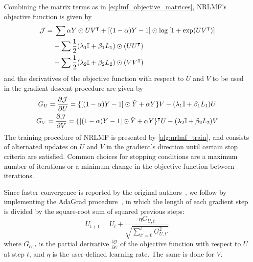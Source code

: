 Combining the matrix terms as in \autoref{eq:lmf_objective_matrices}, NRLMF's objective function is given by
%
\begin{equation}
    \begin{split}
        \mathcal{J} = &\; \sum
                \alpha Y \odot UV^\intercal
                + [(1 - \alpha) Y - 1] \odot \log \left[1+\exp(UV^\intercal)\right]\\
            &- \sum \frac{1}{2} (\lambda_1\mathbb{I} + \beta_1 L_1) \odot (U U^\intercal)\\
            &- \sum \frac{1}{2} (\lambda_2\mathbb{I} + \beta_2 L_2) \odot (V V^\intercal)
    \end{split}
    \label{eq:nrlmf_objective}
\end{equation}
%
and the derivatives of the objective function with respect to $U$ and $V$ to be used in the gradient descent procedure are given by
\begin{gather}
    G_U = \frac{\partial \mathcal{J}}{\partial U} =
        \{[(1 - \alpha) Y - 1] \odot \hat Y + \alpha Y\}V
        - (\lambda_1\mathbb{I} + \beta_1 L_1) U
    \label{eq:nrlmf_gradient_U}
    \\
    G_V = \frac{\partial \mathcal{J}}{\partial V} =
        \{[(1 - \alpha) Y - 1] \odot \hat Y + \alpha Y\}^\intercal U
        - (\lambda_2\mathbb{I} + \beta_2 L_2) V
    \label{eq:nrlmf_gradient_V}
\end{gather}
%
The training procedure of NRLMF is presented by \autoref{alg:nrlmf_train}, and consists of alternated updates on $U$ and $V$ in the gradient's direction until certain stop criteria are satisfied. Common choices for stopping conditions are a maximum number of iterations or a minimum change in the objective function between iterations.

Since faster convergence is reported by the original authors~\cite{johnsonlogistic}, we follow \textcite{johnsonlogistic,liu2016neighborhooda} by implementing the AdaGrad procedure~\cite{duchi2011adaptive}, in which the length of each gradient step is divided by the square-root sum of squared previous steps:
%
\begin{equation}
    U_{t+1} = U_t + \frac{\eta G_{U,t}}{\sqrt{\sum_{t'=0}^t G_{U,t'}^2}}
\end{equation}
%
where $G_{U,t}$ is the partial derivative $\frac{\partial\mathcal{J}}{\partial U}$ of the objective function with respect to $U$ at step $t$, and $\eta$ is the user-defined learning rate. The same is done for $V$.

